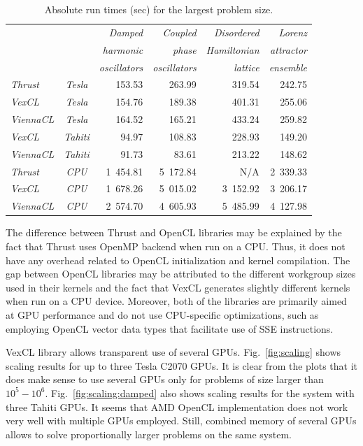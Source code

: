 \documentclass[final]{siamltex}
\newcommand{\figref}[1]{Fig.~\ref{#1}}
\begin{document}
\begin{table}
    \caption{Absolute run times (sec) for the largest problem size.}
    \label{tab:abstimes}
    \begin{tabular}{|lc|rrrr|}
	\hline
	& & \em Damped	    & \em Coupled	& \em Disordered    & \em Lorenz    \\
	& & \em harmonic    & \em phase		& \em Hamiltonian   & \em attractor \\
	& & \em oscillators & \em oscillators	& \em lattice	    & \em ensemble  \\
	\hline
	\em Thrust   &\em Tesla & 153.53 & 263.99 & 319.54 & 242.75 \\
	\em VexCL    &\em Tesla & 154.76 & 189.38 & 401.31 & 255.06 \\
	\em ViennaCL &\em Tesla & 164.52 & 165.21 & 433.24 & 259.82 \\
	\hline
	\em VexCL    &\em Tahiti &  94.97 & 108.83 & 228.93 & 149.20 \\
	\em ViennaCL &\em Tahiti &  91.73 &  83.61 & 213.22 & 148.62 \\
	\hline
	\em Thrust   &\em CPU	& 1~454.81 & 5~172.84 &      N/A & 2~339.33 \\
	\em VexCL    &\em CPU	& 1~678.26 & 5~015.02 & 3~152.92 & 3~206.17 \\
	\em ViennaCL &\em CPU	& 2~574.70 & 4~605.93 & 5~485.99 & 4~127.98 \\
	\hline
    \end{tabular}
\end{table}


The difference between Thrust and OpenCL libraries may be explained by the fact
that Thrust uses OpenMP backend when run on a CPU. Thus, it does not have any
overhead related to OpenCL initialization and kernel compilation.  The gap
between OpenCL libraries may be attributed to the different workgroup sizes
used in their kernels and the fact that VexCL generates slightly different
kernels when run on a CPU device. Moreover, both of the libraries are primarily
aimed at GPU performance and do not use CPU-specific optimizations, such as
employing OpenCL vector data types that facilitate use of SSE instructions.

VexCL library allows transparent use of several GPUs. \figref{fig:scaling}
shows scaling results for up to three Tesla C2070 GPUs. It is clear from the
plots that it does make sense to use several GPUs only for problems of size
larger than $10^5-10^6$. \figref{fig:scaling:damped} also shows
scaling results for the system with three Tahiti GPUs. It seems that AMD OpenCL
implementation does not work very well with multiple GPUs employed. Still,
combined memory of several GPUs allows to solve proportionally larger problems
on the same system.
\end{document}
